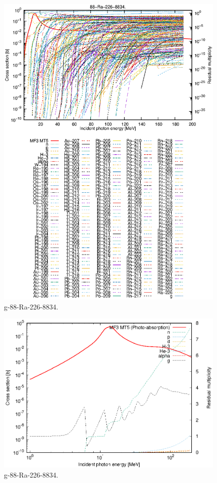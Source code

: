 \begin{figure}
 \includegraphics[width=\linewidth]{eps/g_88-Ra-226_8834.eps}
  \caption{g-88-Ra-226-8834.}
\end{figure}
\newpage \clearpage

\begin{figure}
 \includegraphics[width=\linewidth]{eps-log/g_88-Ra-226_8834.eps}
 \caption{g-88-Ra-226-8834.}
\end{figure}
\newpage \clearpage

